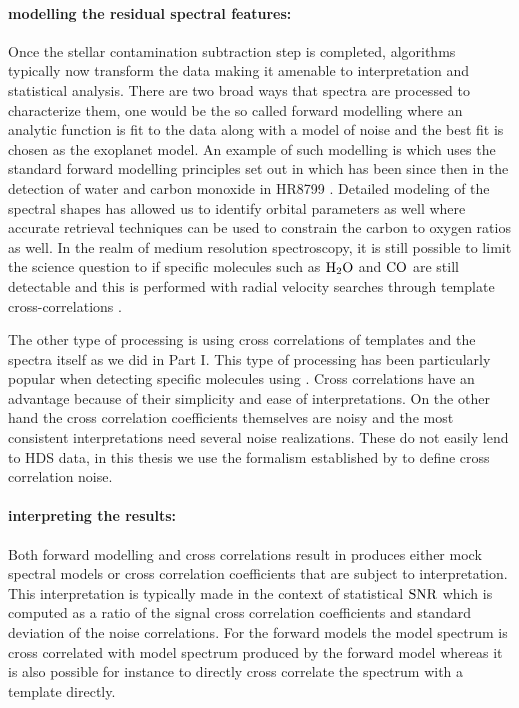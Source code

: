 \paragraph{modelling the residual spectral features:\\}
Once the stellar contamination subtraction step is completed, algorithms typically now transform the data making it amenable to interpretation and statistical analysis.
There are two broad ways that spectra are processed to characterize them, one would be the so called forward modelling where an analytic function is fit to the data along with a model of noise and the best fit is chosen as the exoplanet model.
An example of such modelling is \citep[BREADS, ][]{2023Agrawal} which uses the standard forward modelling principles set out in \cite{ruffio2019radial} which has been since then in the detection of water and carbon monoxide in HR8799 \citep[][]{2021Ruffio}.
Detailed modeling of the spectral shapes has allowed us to identify orbital parameters as well \cite{2022BWang} where accurate retrieval techniques can be used to constrain the carbon to oxygen ratios as well.
In the realm of medium resolution spectroscopy, it is still possible to limit the science question to if specific molecules such as $\rm{H_2O}$ and $\rm{CO}$ are still detectable and this is performed with radial velocity searches through template cross-correlations \citep[e.g][]{2021Ruffio}.

The other type of processing is using cross correlations of templates and the spectra itself as we did in Part I. 
This type of processing has been particularly popular when detecting specific molecules using \citep[for e.g Molecule maps][]{2018AHoeijmakersMM}. 
Cross correlations have an advantage because of their simplicity and ease of interpretations. 
On the other hand the cross correlation coefficients themselves are noisy and the most consistent interpretations need several noise realizations.
These do not easily lend to HDS data, in this thesis we use the formalism established by \cite{ruffio2019radial} to define cross correlation noise.

\paragraph{interpreting the results:\\}
Both forward modelling and cross correlations result in produces either mock spectral models or cross correlation coefficients that are subject to interpretation.
This interpretation is typically made in the context of statistical $\rm{SNR}$ which is computed as a ratio of the signal cross correlation coefficients and standard deviation of the noise correlations. 
For the forward models the model spectrum is cross correlated with model spectrum produced by the forward model whereas it is also possible for instance to directly cross correlate the spectrum with a template directly.

